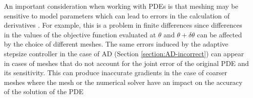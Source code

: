 An important consideration when working with PDEs is that meshing may be sensitive to model parameters which can lead to errors in the calculation of derivatives \cite{nadarajah2000comparison}. 
For example, this is a problem in finite differences since differences in the values of the objective function evaluated at $\theta$ and $\theta + \delta \theta$ can be affected by the choice of different meshes. 
The same errors induced by the adaptive stepsize controller in the case of AD (Section \ref{section:AD-incorrect}) can appear in cases of meshes that do not account for the joint error of the original PDE and its sensitivity. 
This can produce inaccurate gradients in the case of coarser meshes where the mesh or the numerical solver have an impact on the accuracy of the solution of the PDE \cite{economon2017adjoint, KENWAY2019100542}

